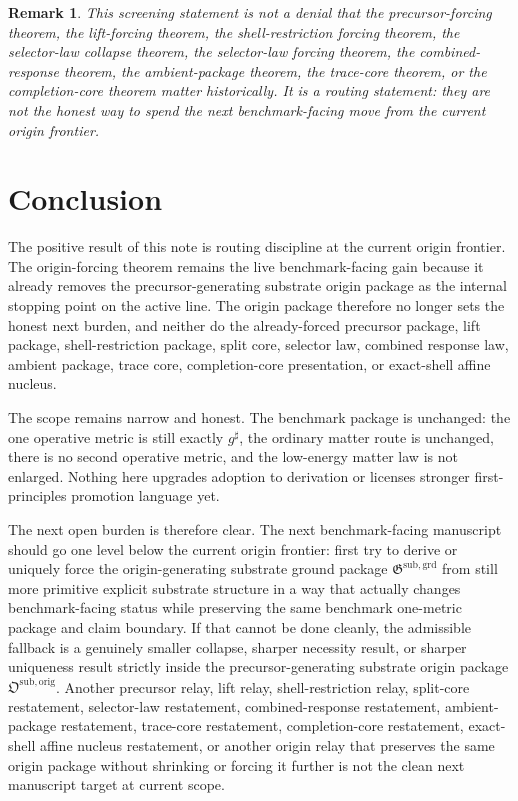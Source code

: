 \documentclass[11pt]{article}
\newcommand{\CompletedMetric}{g^{\sharp}}
\newcommand{\OriginPackage}{\mathfrak O^{\mathrm{sub,orig}}}
\newcommand{\GroundPackage}{\mathfrak G^{\mathrm{sub,grd}}}
\newtheorem{remark}{Remark}
\begin{document}
\begin{remark}
This screening statement is not a denial that the precursor-forcing theorem, the lift-forcing theorem, the shell-restriction forcing theorem, the selector-law collapse theorem, the selector-law forcing theorem, the combined-response theorem, the ambient-package theorem, the trace-core theorem, or the completion-core theorem matter historically. It is a routing statement: they are not the honest way to spend the next benchmark-facing move from the current origin frontier.
\end{remark}

\section{Conclusion}

The positive result of this note is routing discipline at the current origin frontier. The origin-forcing theorem remains the live benchmark-facing gain because it already removes the precursor-generating substrate origin package as the internal stopping point on the active line. The origin package therefore no longer sets the honest next burden, and neither do the already-forced precursor package, lift package, shell-restriction package, split core, selector law, combined response law, ambient package, trace core, completion-core presentation, or exact-shell affine nucleus.

The scope remains narrow and honest. The benchmark package is unchanged: the one operative metric is still exactly \(\CompletedMetric\), the ordinary matter route is unchanged, there is no second operative metric, and the low-energy matter law is not enlarged. Nothing here upgrades adoption to derivation or licenses stronger first-principles promotion language yet.

The next open burden is therefore clear. The next benchmark-facing manuscript should go one level below the current origin frontier: first try to derive or uniquely force the origin-generating substrate ground package \(\GroundPackage\) from still more primitive explicit substrate structure in a way that actually changes benchmark-facing status while preserving the same benchmark one-metric package and claim boundary. If that cannot be done cleanly, the admissible fallback is a genuinely smaller collapse, sharper necessity result, or sharper uniqueness result strictly inside the precursor-generating substrate origin package \(\OriginPackage\). Another precursor relay, lift relay, shell-restriction relay, split-core restatement, selector-law restatement, combined-response restatement, ambient-package restatement, trace-core restatement, completion-core restatement, exact-shell affine nucleus restatement, or another origin relay that preserves the same origin package without shrinking or forcing it further is not the clean next manuscript target at current scope.
\end{document}

